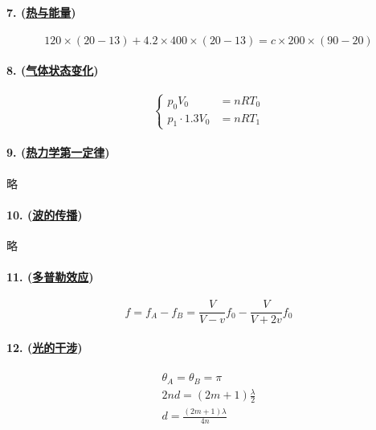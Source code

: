 \paragraph{7. (\hyperref[sec:热与能量]{热与能量})}

\begin{equation*}
    120\times(20-13)+4.2\times400\times(20-13)=c\times200\times(90-20)
\end{equation*}

\paragraph{8. (\hyperref[subsec:气体状态变化]{气体状态变化})}

\begin{equation*}
    \begin{cases}
        p_0V_0&=nRT_0\\
        p_1\cdot1.3V_0&=nRT_1
    \end{cases}
\end{equation*}

\paragraph{9. (\hyperref[subsec:热力学第一定律]{热力学第一定律})} 略

\paragraph{10. (\hyperref[subsec:波的传播]{波的传播})} 略

\paragraph{11. (\hyperref[subsec:多普勒效应]{多普勒效应})}

\begin{equation*}
    f=f_A-f_B=\frac{V}{V-v}f_0-\frac{V}{V+2v}f_0
\end{equation*}

\paragraph{12. (\hyperref[subsec:光的干涉]{光的干涉})}

\begin{gather*}
    \theta_A=\theta_B=\pi\\
    2nd=(2m+1)\frac\lambda2\\
    d=\frac{(2m+1)\lambda}{4n}
\end{gather*}

